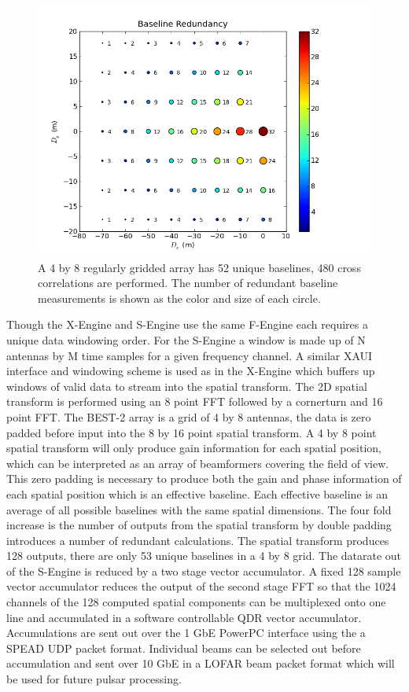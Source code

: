 \documentclass[useAMS,macros,usenatbib,onecolumn]{mn2e}
\begin{document}
\begin{figure}
    \centering
    \includegraphics[scale=0.6]{graphics/redbl.png}
    \caption{A 4 by 8 regularly gridded array has 52 unique baselines, 480 cross correlations are performed. The number of redundant baseline measurements is shown as the color and size of each circle.}
    \label{fig:redbl}
\end{figure}

Though the X-Engine and S-Engine use the same F-Engine each requires a unique data windowing order.
For the S-Engine a window is made up of N antennas by M time samples for a given frequency channel.
A similar XAUI interface and windowing scheme is used as in the X-Engine which buffers up windows of valid data to stream into the spatial transform.
The 2D spatial transform is performed using an 8 point FFT followed by a cornerturn and 16 point FFT.
The BEST-2 array is a grid of 4 by 8 antennas, the data is zero padded before input into the 8 by 16 point spatial transform.
A 4 by 8 point spatial transform will only produce gain information for each spatial position, which can be interpreted as an array of beamformers covering the field of view.
This zero padding is necessary to produce both the gain and phase information of each spatial position which is an effective baseline.
Each effective baseline is an average of all possible baselines with the same spatial dimensions.
The four fold increase is the number of outputs from the spatial transform by double padding introduces a number of redundant calculations.
The spatial transform produces 128 outputs, there are only 53 unique baselines in a 4 by 8 grid.
The datarate out of the S-Engine is reduced by a two stage vector accumulator.
A fixed 128 sample vector accumulator reduces the output of the second stage FFT so that the 1024 channels of the 128 computed spatial components can be multiplexed onto one line and accumulated in a software controllable QDR vector accumulator.
Accumulations are sent out over the 1 GbE PowerPC interface using the a SPEAD UDP packet format.
Individual beams can be selected out before accumulation and sent over 10 GbE in a LOFAR beam packet format which will be used for future pulsar processing.
\end{document}
